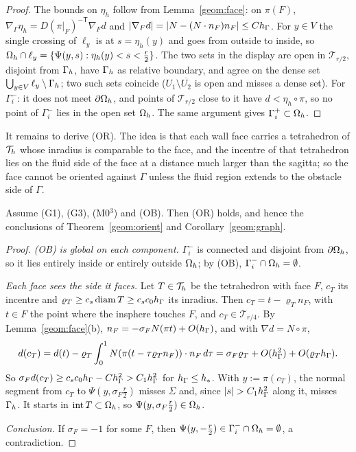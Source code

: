 \begin{proof}
The bounds on $\eta_h$ follow from Lemma~\ref{geom:face}: on $\pi(F)$, $\nabla_\Gamma\eta_h=D(\pi|_F)^{-\mathsf T}\nabla_Fd$ and $|\nabla_Fd|=|N-(N\cdot n_F)n_F|\le Ch_\Gamma$. For $y\in V$ the single crossing of $\ell_y$ is at $s=\eta_h(y)$ and goes from outside to inside, so $\Omega_h\cap\ell_y=\{\Psi(y,s):\eta_h(y)<s<\frac r2\}$. The two sets in the display are open in $\mathcal T_{r/2}$, disjoint from $\Gamma_h$, have $\Gamma_h$ as relative boundary, and agree on the dense set $\bigcup_{y\in V}\ell_y\setminus\Gamma_h$; two such sets coincide ($U_1\setminus\overline{U_2}$ is open and misses a dense set). For $\Gamma_i^-$: it does not meet $\partial\Omega_h$, and points of $\mathcal T_{r/2}$ close to it have $d<\eta_h\circ\pi$, so no point of $\Gamma_i^-$ lies in the open set $\Omega_h$. The same argument gives $\Gamma_i^+\subset\Omega_h$.
\end{proof}

It remains to derive (OR). The idea is that each wall face carries a tetrahedron of $\mathcal T_h$ whose inradius is comparable to the face, and the incentre of that tetrahedron lies on the fluid side of the face at a distance much larger than the sagitta; so the face cannot be oriented against $\Gamma$ unless the fluid region extends to the obstacle side of $\Gamma$.

\begin{theorem}\label{geom:mesh}
Assume (G1), (G3), (M0$^3$) and (OB). Then (OR) holds, and hence the conclusions of Theorem~\ref{geom:orient} and Corollary~\ref{geom:graph}.
\end{theorem}

\begin{proof}
\emph{(OB) is global on each component.} $\Gamma_i^-$ is connected and disjoint from $\partial\Omega_h$, so it lies entirely inside or entirely outside $\Omega_h$; by (OB), $\Gamma_i^-\cap\Omega_h=\emptyset$.

\emph{Each face sees the side it faces.} Let $T\in\mathcal T_h$ be the tetrahedron with face $F$, $c_T$ its incentre and $\varrho_T\ge c_s\operatorname{diam} T\ge c_sc_0h_\Gamma$ its inradius. Then $c_T=t-\varrho_Tn_F$, with $t\in F$ the point where the insphere touches $F$, and $c_T\in\mathcal T_{r/4}$. By Lemma~\ref{geom:face}(b), $n_F=-\sigma_FN(\pi t)+O(h_\Gamma)$, and with $\nabla d=N\circ\pi$,
\[
d(c_T)=d(t)-\varrho_T\int_0^1N(\pi(t-\tau\varrho_Tn_F))\cdot n_F\,d\tau=\sigma_F\varrho_T+O(h_\Gamma^2)+O(\varrho_Th_\Gamma).
\]
So $\sigma_Fd(c_T)\ge c_sc_0h_\Gamma-Ch_\Gamma^2>C_1h_\Gamma^2$ for $h_\Gamma\le h_\ast$. With $y:=\pi(c_T)$, the normal segment from $c_T$ to $\Psi(y,\sigma_F\frac r2)$ misses $\Sigma$ and, since $|s|>C_1\hG^2$ along it, misses $\Gamma_h$. It starts in $\operatorname{int}T\subset\Omega_h$, so $\Psi(y,\sigma_F\frac r2)\in\Omega_h$.

\emph{Conclusion.} If $\sigma_F=-1$ for some $F$, then $\Psi(y,-\frac r2)\in\Gamma_i^-\cap\Omega_h=\emptyset$, a contradiction.
\end{proof}

